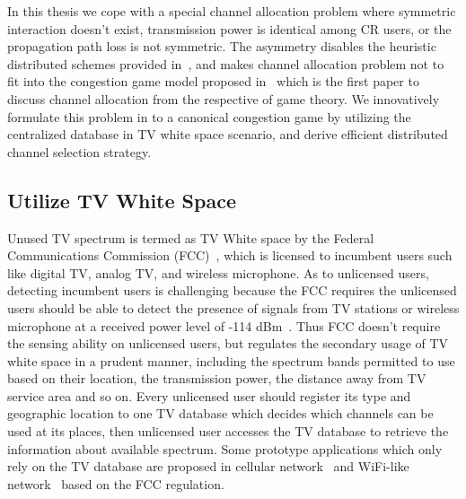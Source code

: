 In this thesis we cope with a special channel allocation problem where symmetric interaction doesn't exist, \ie transmission power is identical among CR users, or the propagation path loss is not symmetric. 
The asymmetry disables the heuristic distributed schemes provided in~\cite{Babadi08, Ko_DistributedCA}, and makes channel allocation problem not to fit into the congestion game model proposed in~\cite{allerton08_liu} which is the first paper to discuss channel allocation from the respective of game theory.
We innovatively formulate this problem in to a canonical congestion game by utilizing the centralized database in TV white space scenario, and derive efficient distributed channel selection strategy.

\subsection{Utilize TV White Space}
Unused TV spectrum is termed as TV White space by the Federal Communications Commission (FCC)~\cite{FCC_2010_sedond_memorandumm}, which is licensed to incumbent users such like digital TV, analog TV, and wireless microphone.
As to unlicensed users, detecting incumbent users is challenging because the FCC requires the unlicensed users should be able to detect the presence of signals from TV stations or wireless microphone at a received power level of -114 dBm~\cite{Technical_Challenges_TVwhit}. 
Thus FCC doesn't require the sensing ability on unlicensed users, but regulates the secondary usage of TV white space in a prudent manner, including the spectrum bands permitted to use based on their location, the transmission power, the distance away from TV service area and so on.
Every unlicensed user should register its type and geographic location to one TV database which decides which channels can be used at its places, then unlicensed user accesses the TV database to retrieve the information about available spectrum.
Some prototype applications which only rely on the TV database are proposed in cellular network~\cite{tvwhite_lte2011, multicell_geo_dyspan11} and WiFi-like network~\cite{whitefi09} based on the FCC regulation.
  
